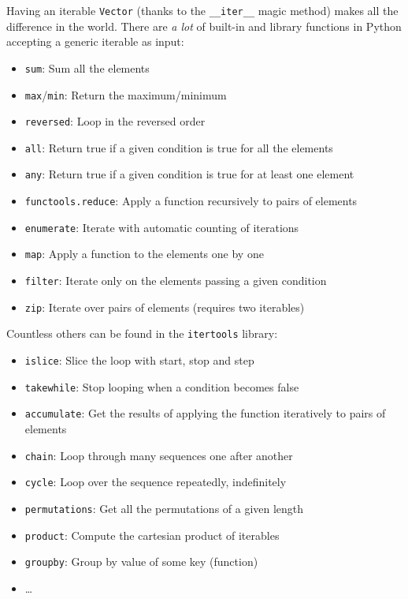 Having an iterable \texttt{Vector} (thanks to the \texttt{\_\_iter\_\_} magic method) makes all the difference in the world. There are \emph{a lot} of built-in and library functions in Python accepting a generic iterable as input:
\begin{itemize}
    \item[-] \texttt{sum}: Sum all the elements
    \item[-] \texttt{max}/\texttt{min}: Return the maximum/minimum
    \item[-] \texttt{reversed}: Loop in the reversed order
    \item[-] \texttt{all}: Return true if a given condition is true for all the elements
    \item[-] \texttt{any}: Return true if a given condition is true for at least one element
    \item[-] \texttt{functools.reduce}: Apply a function recursively to pairs of elements
    \item[-] \texttt{enumerate}: Iterate with automatic counting of iterations
    \item[-] \texttt{map}: Apply a function to the elements one by one
    \item[-] \texttt{filter}: Iterate only on the elements passing a given condition
    \item[-] \texttt{zip}: Iterate over pairs of elements (requires two iterables)
\end{itemize}

Countless others can be found in the \texttt{itertools} library:
\begin{itemize}
    \item[-] \texttt{islice}: Slice the loop with start, stop and step
    \item[-] \texttt{takewhile}: Stop looping when a condition becomes false
    \item[-] \texttt{accumulate}: Get the results of applying the function iteratively to pairs of elements
    \item[-] \texttt{chain}: Loop through many sequences one after another
    \item[-] \texttt{cycle}: Loop over the sequence repeatedly, indefinitely
    \item[-] \texttt{permutations}: Get all the permutations of a given length
    \item[-] \texttt{product}: Compute the cartesian product of iterables
    \item[-] \texttt{groupby}: Group by value of some key (function)
    \item[-] \dots
\end{itemize}

